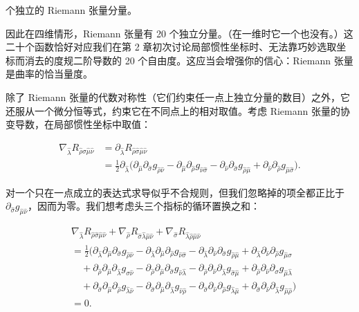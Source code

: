 个独立的 Riemann 张量分量。

因此在四维情形，Riemann 张量有 20 个独立分量。（在一维时它一个也没有。）这二十个函数恰好对应我们在第 2 章初次讨论局部惯性坐标时、无法靠巧妙选取坐标而消去的度规二阶导数的 20 个自由度。这应当会增强你的信心：Riemann 张量是曲率的恰当量度。

除了 Riemann 张量的代数对称性（它们约束任一点上独立分量的数目）之外，它还服从一个微分恒等式，约束它在不同点上的相对取值。考虑 Riemann 张量的协变导数，在局部惯性坐标中取值：

\begin{align*}
\nabla_{\hat\lambda}R_{\hat\rho\hat\sigma\hat\mu\hat\nu} &= \partial_{\hat\lambda}R_{\hat\rho\hat\sigma\hat\mu\hat\nu}\\
&= \tfrac{1}{2}\partial_{\hat\lambda}\big(\partial_{\hat\mu}\partial_{\hat\sigma}g_{\hat\rho\hat\nu} - \partial_{\hat\mu}\partial_{\hat\rho}g_{\hat\nu\hat\sigma} - \partial_{\hat\nu}\partial_{\hat\sigma}g_{\hat\rho\hat\mu} + \partial_{\hat\nu}\partial_{\hat\rho}g_{\hat\mu\hat\sigma}\big). \tag{3.138}
\end{align*}

对一个只在一点成立的表达式求导似乎不合规则，但我们忽略掉的项全都正比于 $\partial_{\hat\sigma}g_{\hat\mu\hat\nu}$，因而为零。我们想考虑头三个指标的循环置换之和：

\begin{align*}
&\nabla_{\hat\lambda}R_{\hat\rho\hat\sigma\hat\mu\hat\nu} + \nabla_{\hat\rho}R_{\hat\sigma\hat\lambda\hat\mu\hat\nu} + \nabla_{\hat\sigma}R_{\hat\lambda\hat\rho\hat\mu\hat\nu}\\
&= \tfrac{1}{2}\big(\partial_{\hat\lambda}\partial_{\hat\mu}\partial_{\hat\sigma}g_{\hat\rho\hat\nu} - \partial_{\hat\lambda}\partial_{\hat\mu}\partial_{\hat\rho}g_{\hat\nu\hat\sigma} - \partial_{\hat\lambda}\partial_{\hat\nu}\partial_{\hat\sigma}g_{\hat\rho\hat\mu} + \partial_{\hat\lambda}\partial_{\hat\nu}\partial_{\hat\rho}g_{\hat\mu\hat\sigma}\\
&\quad + \partial_{\hat\rho}\partial_{\hat\mu}\partial_{\hat\lambda}g_{\hat\sigma\hat\nu} - \partial_{\hat\rho}\partial_{\hat\mu}\partial_{\hat\sigma}g_{\hat\nu\hat\lambda} - \partial_{\hat\rho}\partial_{\hat\nu}\partial_{\hat\lambda}g_{\hat\sigma\hat\mu} + \partial_{\hat\rho}\partial_{\hat\nu}\partial_{\hat\sigma}g_{\hat\mu\hat\lambda}\\
&\quad + \partial_{\hat\sigma}\partial_{\hat\mu}\partial_{\hat\rho}g_{\hat\lambda\hat\nu} - \partial_{\hat\sigma}\partial_{\hat\mu}\partial_{\hat\lambda}g_{\hat\nu\hat\rho} - \partial_{\hat\sigma}\partial_{\hat\nu}\partial_{\hat\rho}g_{\hat\lambda\hat\mu} + \partial_{\hat\sigma}\partial_{\hat\nu}\partial_{\hat\lambda}g_{\hat\mu\hat\rho}\big)\\
&= 0. \tag{3.139}
\end{align*}

